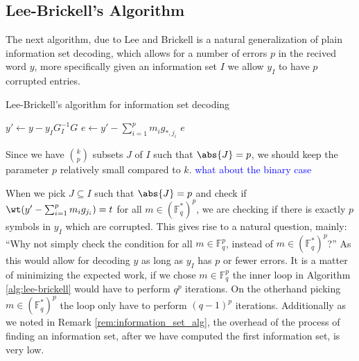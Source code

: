  \subsection{Lee-Brickell's Algorithm}
 The next algorithm, due to Lee and Brickell is a natural generalization of plain information set decoding, which allows for a number of errors $p$ in the recived word $y$, more specifically given an information set $I$ we allow $y_I$ to have $p$ corrupted entries.

 \begin{algorithm}[H]
 \caption{Lee-Brickell's algorithm for information set decoding}\label{alg:lee-brickell}
 \begin{algorithmic}
  \State $y' \gets y - y_I G_I^{-1}G$
    \State $e \gets y' - \sum_{i=1}^p m_i g_{*, j_i}$
    \State \Return $e$
    \EndIf
  \EndFor
  \EndFor
  \EndFor
  \EndProcedure
 \end{algorithmic}
 \end{algorithm}
 Since we have $\binom{k}{p}$ subsets $J$ of $I$ such that $\abs{J} = p$, we should keep the parameter $p$ relatively small compared to $k$.  \textcolor{blue}{what about the binary case}

 When we pick $J \subseteq I$ such that $\abs{J} = p$ and check if $\wt(y' - \sum_{i=1}^p m_ig_{j_{i}}) = t$ for all $m \in (\mathbb{F}_q^{*})^{p}$, we are checking if there is exactly $p$ symbols in $y_I$ which are corrupted. This gives rise to a natural question, mainly: ``Why not simply check the condition for all $m \in \mathbb{F}_q^{p}$, instead of $m \in (\mathbb{F}_q^{*})^{p}$?'' As this would allow for decoding $y$ as long as $y_I$ has $p$ or fewer errors. It is a matter of minimizing the expected work, if we chose $m \in \mathbb{F}_q^{p}$ the inner loop in Algorithm \ref{alg:lee-brickell} would have to perform $q^p$ iterations. On the otherhand picking $m \in (\mathbb{F}_q^{*})^{p}$ the loop only have to perform $(q - 1)^p$ iterations. Additionally as we noted in Remark \ref{rem:information_set_alg}, the overhead of the process of finding an information set, after we have computed the first information set, is very low.

